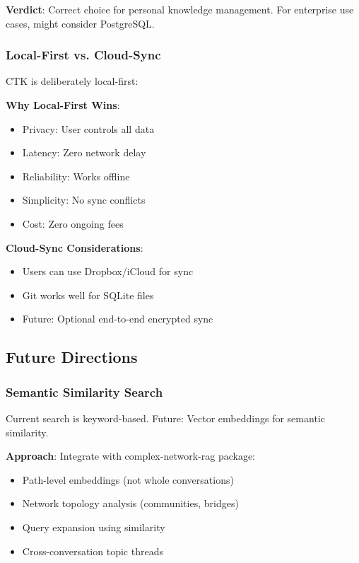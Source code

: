 \documentclass[11pt,letterpaper]{article}
\begin{document}
\textbf{Verdict}: Correct choice for personal knowledge management. For enterprise use cases, might consider PostgreSQL.

\subsubsection{Local-First vs. Cloud-Sync}

CTK is deliberately local-first:

\textbf{Why Local-First Wins}:
\begin{itemize}
    \item Privacy: User controls all data
    \item Latency: Zero network delay
    \item Reliability: Works offline
    \item Simplicity: No sync conflicts
    \item Cost: Zero ongoing fees
\end{itemize}

\textbf{Cloud-Sync Considerations}:
\begin{itemize}
    \item Users can use Dropbox/iCloud for sync
    \item Git works well for SQLite files
    \item Future: Optional end-to-end encrypted sync
\end{itemize}

\subsection{Future Directions}

\subsubsection{Semantic Similarity Search}

Current search is keyword-based. Future: Vector embeddings for semantic similarity.

\textbf{Approach}: Integrate with complex-network-rag package:
\begin{itemize}
    \item Path-level embeddings (not whole conversations)
    \item Network topology analysis (communities, bridges)
    \item Query expansion using similarity
    \item Cross-conversation topic threads
\end{itemize}
\end{document}
